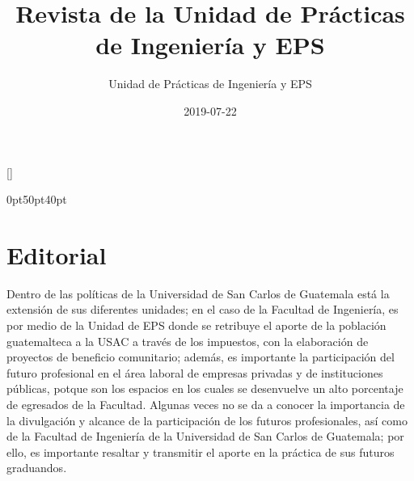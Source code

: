 \documentclass[11pt,spanish,Letterpaper,openany]{book}
\title{Revista de la Unidad de Prácticas de Ingeniería y EPS}
\author{Unidad de Prácticas de Ingeniería y EPS}
\date{2019-07-22}
\makeatletter
\renewcommand\frontmatter{\clearpage\@mainmatterfalse\pagenumbering{roman}}
\makeatother
\begin{document}
\maketitle




\frontmatter

\titleformat{\chapter}[display]{\bfseries\Large}{\relax}{0ex}{\titlerule\filright}[\vspace{1ex}\titlerule]

\titlespacing*{\chapter} {0pt}{50pt}{40pt}

\hypertarget{index}{%
\chapter*{Editorial}\label{index}}

Dentro de las políticas de la Universidad de San Carlos de Guatemala está la extensión de sus diferentes unidades; en el caso de la Facultad de Ingeniería, es por medio de la Unidad de EPS donde se retribuye el aporte de la población guatemalteca a la USAC a través de los impuestos, con la elaboración de proyectos de beneficio comunitario; además, es importante la participación del futuro profesional en el área laboral de empresas privadas y de instituciones públicas, potque son los espacios en los cuales se desenvuelve un alto porcentaje de egresados de la Facultad. Algunas veces no se da a conocer la importancia de la divulgación y alcance de la participación de los futuros profesionales, así como de la Facultad de Ingeniería de la Universidad de San Carlos de Guatemala; por ello, es importante resaltar y transmitir el aporte en la práctica de sus futuros graduandos.
\end{document}
